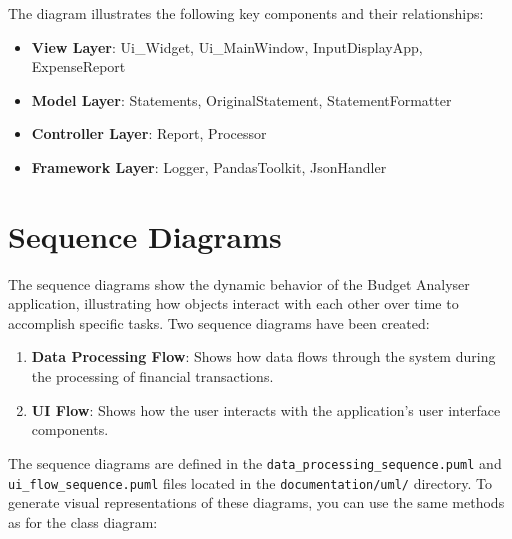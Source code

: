 \documentclass[11pt,a4paper]{report}
\begin{document}
The diagram illustrates the following key components and their relationships:
\begin{itemize}
    \item \textbf{View Layer}: Ui\_Widget, Ui\_MainWindow, InputDisplayApp, ExpenseReport
    \item \textbf{Model Layer}: Statements, OriginalStatement, StatementFormatter
    \item \textbf{Controller Layer}: Report, Processor
    \item \textbf{Framework Layer}: Logger, PandasToolkit, JsonHandler
\end{itemize}

\section{Sequence Diagrams}
The sequence diagrams show the dynamic behavior of the Budget Analyser application, illustrating how objects interact with each other over time to accomplish specific tasks. Two sequence diagrams have been created:

\begin{enumerate}
    \item \textbf{Data Processing Flow}: Shows how data flows through the system during the processing of financial transactions.
    \item \textbf{UI Flow}: Shows how the user interacts with the application's user interface components.
\end{enumerate}

The sequence diagrams are defined in the \texttt{data\_processing\_sequence.puml} and \texttt{ui\_flow\_sequence.puml} files located in the \texttt{documentation/uml/} directory. To generate visual representations of these diagrams, you can use the same methods as for the class diagram:
\end{document}
